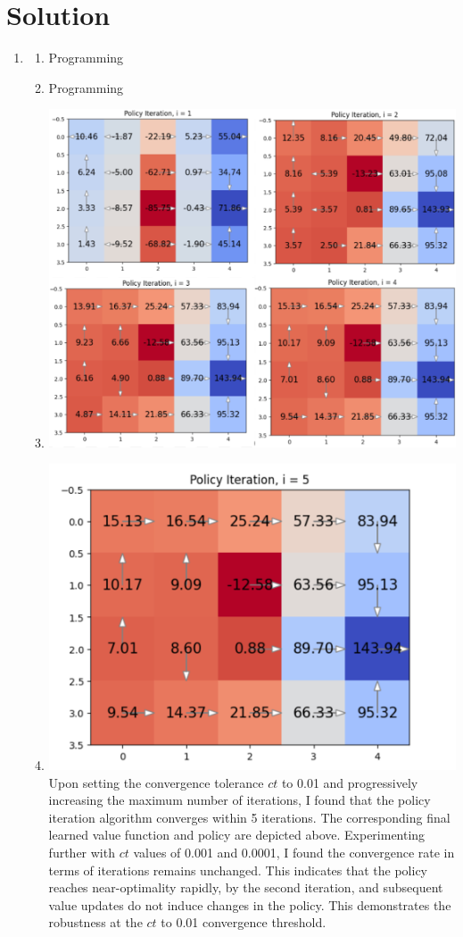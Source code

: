 \documentclass[submit]{harvardml}
\newenvironment{solution}
  {\color{blue}\section*{Solution}}
{}
\begin{document}
\begin{solution}


\begin{enumerate}
\item 
\begin{enumerate}
\item Programming
\item Programming
\item \includegraphics[width=0.5\linewidth]{hw6/prob21c.png}
\item \includegraphics[width=0.5\linewidth]{hw6/prob21d.png} \newline
Upon setting the convergence tolerance \( ct \) to 0.01 and progressively increasing the maximum number of iterations, I found that the policy iteration algorithm converges within 5 iterations. The corresponding final learned value function and policy are depicted above. Experimenting further with \( ct \) values of 0.001 and 0.0001, I found the convergence rate in terms of iterations remains unchanged. This indicates that the policy reaches near-optimality rapidly, by the second iteration, and subsequent value updates do not induce changes in the policy. This demonstrates the robustness at the \( ct \) to 0.01 convergence threshold.
\end{enumerate}


\end{enumerate}
\end{solution}
\end{document}
